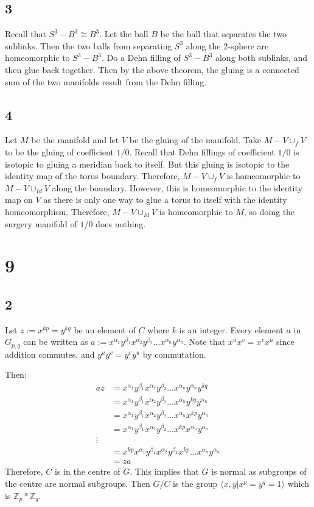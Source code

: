 \documentclass{article}
\theoremstyle{definition}
\numberwithin{theorem}{section}
\numberwithin{equation}{section}
\begin{document}
\subsection{3}
Recall that $S^3 - B^3 \cong B^3$. Let the ball $B$ be the ball that separates the two sublinks. Then the two balls from separating $S^3$ along the 2-sphere are homeomorphic to $S^3 - B^3$. Do a Dehn filling of $S^3 - B^3$ along both sublinks, and then glue back together. Then by the above theorem, the gluing is a connected sum of the two manifolds result from the Dehn filling. 

\subsection{4}
Let $M$ be the manifold and let $V$ be the gluing of the manifold. Take $M - V \cup_f V$ to be the gluing of coefficient $1/0$. 
Recall that Dehn fillings of coefficient $1/0$ is isotopic to gluing a meridian back to itself. But this gluing is isotopic to the identity map of the torus boundary. Therefore, $M - V \cup_f V$ is homeomorphic to $M - V \cup_{Id} V$ along the boundary. However, this is homeomorphic to the identity map on $V$ as there is only one way to glue a torus to itself with the identity homeomorphism. Therefore, $M - V \cup_{Id} V$ is homeomorphic to $M$, so doing the surgery manifold of $1/0$ does nothing. 

\section{9}

\subsection{2}

Let $z := x^{kp} = y^{kq}$ be an element of $C$ where $k$ is an integer. Every element $a$ in $G_{p,q}$ can be written as $a := x^{\alpha_1} y^{\beta_1} x^{\alpha_2} y^{\beta_2} \ldots x^{\alpha_n} y^{\alpha_n}$. Note that $x^{u} x^{v} = x^v x^u$ since addition commutes, and $y^u y^v = y^v y^u$ by commutation.  

Then:
\begin{align*}
    az &= x^{\alpha_1} y^{\beta_1} x^{\alpha_2} y^{\beta_2} \ldots x^{\alpha_n} y^{\alpha_n} y^{kq}\\
    &= x^{\alpha_1} y^{\beta_1} x^{\alpha_2} y^{\beta_2} \ldots x^{\alpha_n} y^{kq}y^{\alpha_n}\\
    &=x^{\alpha_1} y^{\beta_1} x^{\alpha_2} y^{\beta_2} \ldots x^{\alpha_n} x^{kp} y^{\alpha_n}\\
    &=x^{\alpha_1} y^{\beta_1} x^{\alpha_2} y^{\beta_2}\ldots x^{kp} x^{\alpha_n}  y^{\alpha_n}\\
    \vdots\\
    &=x^{kp}x^{\alpha_1} y^{\beta_1} x^{\alpha_2} y^{\beta_2} x^{kp}\ldots x^{\alpha_n}  y^{\alpha_n}\\
    &=za
\end{align*}
Therefore, $C$ is in the centre of $G$. This implies that $G$ is normal as subgroups of the centre are normal subgroups. Then $G/C$ is the group $\langle x, y | x^p = y^q = 1\rangle$ which is $\mathbb{Z}_p * \mathbb{Z}_q$. 
\end{document}
